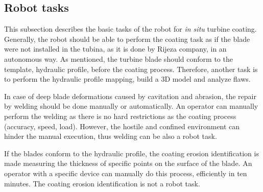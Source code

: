 \subsection{Robot tasks}\label{desc_taref}
This subsection describes the basic tasks of the robot for \textit{in situ}
turbine coating. Generally, the robot should be able to perform the coating task
as if the blade were not installed in the tubina, as it is done by Rijeza
company, in an autonomous way. As mentioned, the turbine blade should conform
to the template, hydraulic profile, before the coating process. Therefore,
another task is to perform the hydraulic profile mapping, build a 3D model and
analyze flaws.


In case of deep blade deformations caused by cavitation and abrasion, the
repair by welding should be done manually or automatically. An operator can
manually perform the welding as there is no hard restrictions as the coating
process (accuracy, speed, load). However, the hostile and confined environment
can hinder the manual execution, thus welding can be also a robot task.

If the blades conform to the hydraulic profile, the coating erosion
identification is made measuring the thickness of specific points on the
surface of the blade. An operator with a specific device can manually do this
process, efficiently in ten minutes. The coating erosion identification is not a
robot task.


